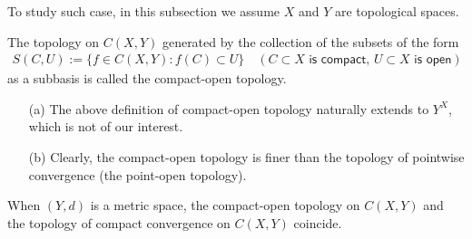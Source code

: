 To study such case, in this subsection we assume $X$ and $Y$ are topological spaces.
\begin{defi}
    The topology on $C(X, Y)$ generated by the collection of the subsets of the form
    \begin{align*}
        S(C, U):=\{f\in C(X, Y): f(C)\subset U\}\quad(C\subset X\textsf{ is compact, }U\subset X\textsf{ is open})
    \end{align*}
    as a subbasis is called the compact-open topology.
\end{defi}
\begin{rmk}
    \begin{enumerate}
        \item[(a)]
        {
            The above definition of compact-open topology naturally extends to $Y^X$, which is not of our interest.
        }
        \item[(b)]
        {
            Clearly, the compact-open topology is finer than the topology of pointwise convergence (the point-open topology).
        }
    \end{enumerate}
\end{rmk}
\begin{obs}\label{compact-open and compact cnvg}
    When $(Y, d)$ is a metric space, the compact-open topology on $C(X, Y)$ and the topology of compact convergence on $C(X, Y)$ coincide.
\end{obs}
